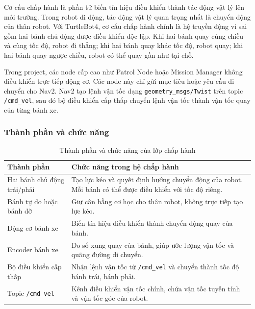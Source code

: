 Cơ cấu chấp hành là phần tử biến tín hiệu điều khiển thành tác động vật lý lên môi trường. Trong robot di động, tác động vật lý quan trọng nhất là chuyển động của thân robot. Với TurtleBot4, cơ cấu chấp hành chính là hệ truyền động vi sai gồm hai bánh chủ động được điều khiển độc lập. Khi hai bánh quay cùng chiều và cùng tốc độ, robot đi thẳng; khi hai bánh quay khác tốc độ, robot quay; khi hai bánh quay ngược chiều, robot có thể quay gần như tại chỗ.

Trong project, các node cấp cao như Patrol Node hoặc Mission Manager không điều khiển trực tiếp động cơ. Các node này chỉ gửi mục tiêu hoặc yêu cầu di chuyển cho Nav2. Nav2 tạo lệnh vận tốc dạng \texttt{geometry\_msgs/Twist} trên topic \texttt{/cmd\_vel}, sau đó bộ điều khiển cấp thấp chuyển lệnh vận tốc thành vận tốc quay của từng bánh xe.

\subsubsection{Thành phần và chức năng}
\label{subsubsec:actuator-components}

\begin{table}[H]
    \centering
    \caption{Thành phần và chức năng của lớp chấp hành}
    \label{tab:actuator-components}
    \renewcommand{\arraystretch}{1.25}
    \small
    \begin{tabularx}{\textwidth}{|>{\raggedright\arraybackslash}p{}|>{\raggedright\arraybackslash}X|}
        \hline
        \textbf{Thành phần} & \textbf{Chức năng trong hệ chấp hành} \\
        \hline
        Hai bánh chủ động trái/phải & Tạo lực kéo và quyết định hướng chuyển động của robot. Mỗi bánh có thể được điều khiển với tốc độ riêng. \\
        \hline
        Bánh tự do hoặc bánh đỡ & Giữ cân bằng cơ học cho thân robot, không trực tiếp tạo lực kéo. \\
        \hline
        Động cơ bánh xe & Biến tín hiệu điều khiển thành chuyển động quay của bánh. \\
        \hline
        Encoder bánh xe & Đo số xung quay của bánh, giúp ước lượng vận tốc và quãng đường di chuyển. \\
        \hline
        Bộ điều khiển cấp thấp & Nhận lệnh vận tốc từ \texttt{/cmd\_vel} và chuyển thành tốc độ bánh trái, bánh phải. \\
        \hline
        Topic \texttt{/cmd\_vel} & Kênh điều khiển vận tốc chính, chứa vận tốc tuyến tính và vận tốc góc của robot. \\
        \hline
    \end{tabularx}
\end{table}

